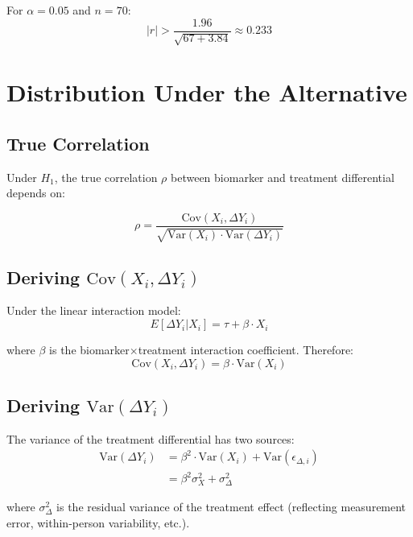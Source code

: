 \documentclass[11pt]{article}
\theoremstyle{definition}
\begin{document}
For $\alpha = 0.05$ and $n = 70$:
\begin{equation}
|r| > \frac{1.96}{\sqrt{67 + 3.84}} \approx 0.233
\end{equation}

\section{Distribution Under the Alternative}

\subsection{True Correlation}

Under $H_1$, the true correlation $\rho$ between biomarker and treatment
differential depends on:

\begin{equation}
\rho = \frac{\text{Cov}(X_i, \Delta Y_i)}{\sqrt{\text{Var}(X_i) \cdot \text{Var}(\Delta Y_i)}}
\end{equation}

\subsection{Deriving $\text{Cov}(X_i, \Delta Y_i)$}

Under the linear interaction model:
\begin{equation}
E[\Delta Y_i | X_i] = \tau + \beta \cdot X_i
\end{equation}

where $\beta$ is the biomarker$\times$treatment interaction coefficient.
Therefore:
\begin{equation}
\text{Cov}(X_i, \Delta Y_i) = \beta \cdot \text{Var}(X_i)
\end{equation}

\subsection{Deriving $\text{Var}(\Delta Y_i)$}

The variance of the treatment differential has two sources:
\begin{align}
\text{Var}(\Delta Y_i) &= \beta^2 \cdot \text{Var}(X_i) + \text{Var}(\epsilon_{\Delta,i}) \\
&= \beta^2 \sigma_X^2 + \sigma_{\Delta}^2
\end{align}

where $\sigma_{\Delta}^2$ is the residual variance of the treatment effect
(reflecting measurement error, within-person variability, etc.).
\end{document}
